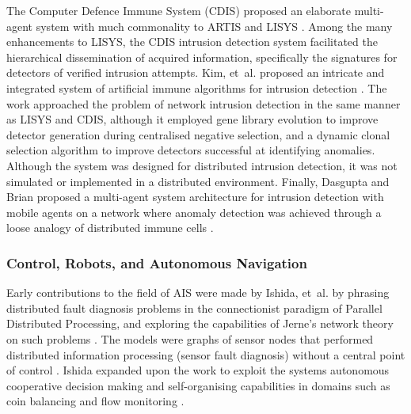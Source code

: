 The Computer Defence Immune System (CDIS) proposed an elaborate multi-agent system with much commonality to ARTIS and LISYS  \cite{Williams2001, Harmer2002, Anchor2002, Anchor2002a}. Among the many enhancements to LISYS, the CDIS intrusion detection system facilitated the hierarchical dissemination of acquired information, specifically the signatures for detectors of verified intrusion attempts. Kim, et~al. proposed an intricate and integrated system of artificial immune algorithms for intrusion detection \cite{Kim1999a, Kim2001a, Kim2002b, Kim2002, Kim2004}. The work approached the problem of network intrusion detection in the same manner as LISYS and CDIS, although it employed gene library evolution to improve detector generation during centralised negative selection, and a dynamic clonal selection algorithm to improve detectors successful at identifying anomalies. Although the system was designed for distributed intrusion detection, it was not simulated or implemented in a distributed environment. Finally, Dasgupta and Brian proposed a multi-agent system architecture for intrusion detection with mobile agents on a network where anomaly detection was achieved through a loose analogy of distributed immune cells \cite{Dasgupta2001a}.


%
%
\subsubsection{Control, Robots, and Autonomous Navigation}
Early contributions to the field of AIS were made by Ishida, et~al. by phrasing distributed fault diagnosis problems in the connectionist paradigm of Parallel Distributed Processing, and exploring the capabilities of Jerne's network theory on such problems \cite{Ishida1990}. The models were graphs of sensor nodes that performed distributed information processing (sensor fault diagnosis) without a central point of control \cite{Mizessyn1993}. Ishida expanded upon the work to exploit the systems autonomous cooperative decision making and self-organising capabilities in domains such as coin balancing and flow monitoring \cite{Ishida1998}.


